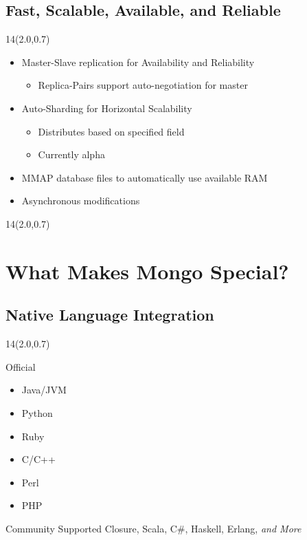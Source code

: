 \documentclass{beamer}
\newcommand{\MongoLogo}{
\begin{textblock}{14}(2.0,0.7)
  \pgfuseimage{logo}
\end{textblock}
}
\begin{document}
\subsection{Fast, Scalable, Available, and Reliable}
\begin{frame}
  \MongoLogo
  \begin{itemize}
  \item Master-Slave replication for Availability and Reliability
    \begin{itemize}
      \item Replica-Pairs support auto-negotiation for master
    \end{itemize}
  \item Auto-Sharding for Horizontal Scalability
    \begin{itemize}
      \item Distributes based on specified field
      \item Currently alpha
    \end{itemize}
  \item MMAP database files to automatically use available RAM
  \item Asynchronous modifications
  \end{itemize}
\end{frame}

\begin{frame}
  \MongoLogo
  \center
\end{frame}

\section{What Makes Mongo Special?}

\subsection{Native Language Integration}

\begin{frame}
  \MongoLogo
  \begin{block}{Official}
    \begin{itemize}
      \item Java/JVM
      \item Python
      \item Ruby
      \item C/C++
      \item Perl
      \item PHP
    \end{itemize}
  \end{block}

  \begin{block}{Community Supported}
    Closure, 
    Scala,
    C\#,
    Haskell,
    Erlang,
    {\it and More}
  \end{block}
\end{frame}
\end{document}
